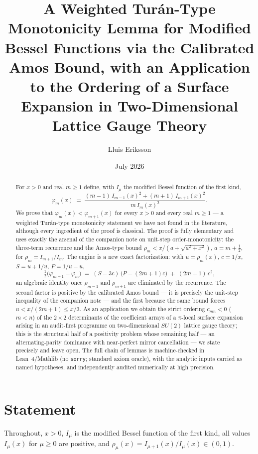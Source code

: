 \documentclass[11pt]{article}
\title{A Weighted Tur\'an-Type Monotonicity Lemma for Modified
Bessel Functions via the Calibrated Amos Bound, with an Application
to the Ordering of a Surface Expansion in Two-Dimensional Lattice
Gauge Theory}
\author{Lluis Eriksson}
\date{July 2026}
\theoremstyle{remark}
\begin{document}
\maketitle

\begin{abstract}
For $x > 0$ and real $m \ge 1$ define, with $I_\mu$ the modified
Bessel function of the first kind,
\[
\varphi_m(x) \;=\;
\frac{(m-1)\,I_{m-1}(x)^2 + (m+1)\,I_{m+1}(x)^2}{m\,I_m(x)^2}.
\]
We prove that $\varphi_m(x) < \varphi_{m+1}(x)$ for every $x>0$ and
every real $m \ge 1$ --- a weighted Tur\'an-type monotonicity
statement we have not found in the literature, although every
ingredient of the proof is classical. The proof is fully elementary
and uses exactly the arsenal of the companion note on unit-step
order-monotonicity: the three-term recurrence and the Amos-type
bound $\rho_m < x/(a + \sqrt{a^2+x^2})$, $a = m + \tfrac12$, for
$\rho_m = I_{m+1}/I_m$. The engine is a new exact factorization:
with $u = \rho_m(x)$, $c = 1/x$, $S = u + 1/u$, $P = 1/u - u$,
\[
\tfrac12\bigl(\varphi_{m+1}-\varphi_m\bigr)
\;=\; (S - 3c)\,\bigl(P - (2m+1)c\bigr) \;+\; (2m+1)\,c^2 ,
\]
an algebraic identity once $\rho_{m-1}$ and $\rho_{m+1}$ are
eliminated by the recurrence. The second factor is positive by the
calibrated Amos bound --- it is precisely the unit-step inequality of
the companion note --- and the first because the same bound forces
$u < x/(2m+1) \le x/3$. As an application we obtain the strict
ordering $c_{mn} < 0$ ($m<n$) of the $2\times2$ determinants of the
coefficient arrays of a $\pi$-local surface expansion arising in an
audit-first programme on two-dimensional $SU(2)$ lattice gauge
theory; this is the structural half of a positivity problem whose
remaining half --- an alternating-parity dominance with
near-perfect mirror cancellation --- we state precisely and leave
open. The full chain of lemmas is machine-checked in Lean~4/Mathlib
(no \texttt{sorry}; standard axiom oracle), with the analytic inputs
carried as named hypotheses, and independently audited numerically
at high precision.
\end{abstract}

\section{Statement}

Throughout, $x > 0$, $I_\mu$ is the modified Bessel function of the
first kind, all values $I_\mu(x)$ for $\mu \ge 0$ are positive, and
$\rho_\mu(x) = I_{\mu+1}(x)/I_\mu(x) \in (0,1)$.
\end{document}
